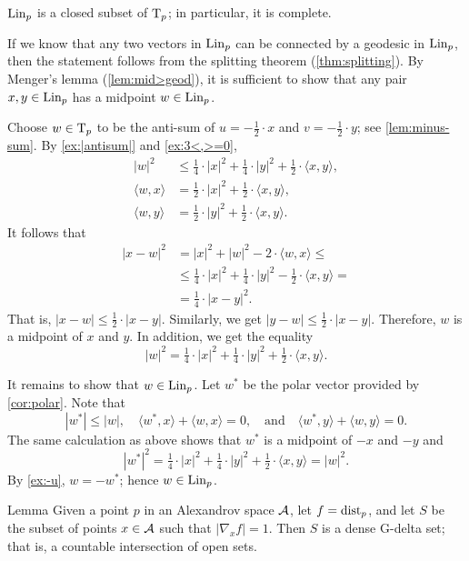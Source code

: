 $\mathop{\rm Lin}\nolimits_p$ is a closed subset of $\mathrm{T}_p$;
in particular, it is complete.

If we know that any two vectors in $\mathop{\rm Lin}\nolimits_p$ can be connected by a geodesic in $\mathop{\rm Lin}\nolimits_p$,
then the statement follows from the splitting theorem (\ref{thm:splitting}).
By Menger's lemma (\ref{lem:mid>geod}), it is sufficient to show that any pair $x,y\in\mathop{\rm Lin}\nolimits_p$ has a midpoint $w\in \mathop{\rm Lin}\nolimits_p$.


Choose $w\in \mathrm{T}_p$ to be the anti-sum of $u=-\tfrac{1}{2}\cdot x$ and $v=-\tfrac{1}{2}\cdot y$;
see \ref{lem:minus-sum}.
By \ref{ex:|antisum|} and \ref{ex:3<,>=0},
\begin{align*}
|w|^2&\le \tfrac14\cdot |x|^2+\tfrac14\cdot|y|^2+\tfrac12\cdot\langle x,y\rangle,
\\
\langle w,x\rangle&= \tfrac12\cdot|x|^2+\tfrac12\cdot\langle x,y\rangle,
\\
\langle w,y\rangle&= \tfrac12\cdot|y|^2+\tfrac12\cdot\langle x,y\rangle.
\end{align*}
It follows that 
\begin{align*}
|x-w|^2
&= |x|^2+|w|^2-2\cdot\langle w,x\rangle\le
\\
&\le \tfrac14\cdot |x|^2+\tfrac14\cdot|y|^2-\tfrac12\cdot\langle x,y\rangle=
\\
&=\tfrac14\cdot|x-y|^2.
\end{align*}
That is, $|x-w|\le \tfrac12\cdot|x-y|$.
Similarly, we get $|y-w|\le \tfrac12\cdot|x-y|$.
Therefore, $w$ is a midpoint of $x$ and $y$.
In addition, we get the equality 
\[|w|^2= \tfrac14\cdot |x|^2+\tfrac14\cdot|y|^2+\tfrac12\cdot\langle x,y\rangle.\]

It remains to show that $w\in\mathop{\rm Lin}\nolimits_p$.
Let $w^*$ be the polar vector provided by \ref{cor:polar}.
Note that 
\[|w^*|\le |w|,
\quad
\langle w^*,x\rangle+\langle w,x\rangle=0,
\quad\text{and}\quad
\langle w^*,y\rangle+\langle w,y\rangle=0.
\]
The same calculation as above shows that $w^*$ is a midpoint of $-x$ and $-y$ and 
\[|w^*|^2= \tfrac14\cdot |x|^2+\tfrac14\cdot|y|^2+\tfrac12\cdot\langle x,y\rangle=|w|^2.\]
By \ref{ex:-u}, $w=-w^*$;
hence $w\in\mathop{\rm Lin}\nolimits_p$.
\qeds

\begin{thm}{Lemma}\label{ex:grad-dist:G-delta}
Given a point $p$ in an Alexandrov space $\mathcal{A}$,
let $f\z=\distfun_p$, and let $S$ be the subset of points $x\in\mathcal{A}$ such that $|\nabla_xf|=1$.
Then $S$ is a dense G-delta set; that is, a countable intersection of open sets.

\end{thm}

